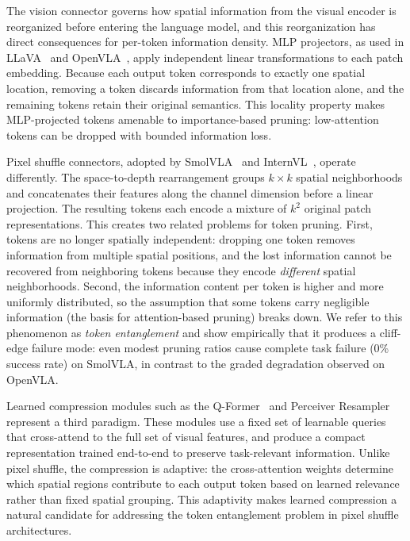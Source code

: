 The vision connector governs how spatial information from the visual encoder is reorganized before entering the language model, and this reorganization has direct consequences for per-token information density. MLP projectors, as used in LLaVA~\cite{liu2023llava} and OpenVLA~\cite{kim2024openvla}, apply independent linear transformations to each patch embedding. Because each output token corresponds to exactly one spatial location, removing a token discards information from that location alone, and the remaining tokens retain their original semantics. This locality property makes MLP-projected tokens amenable to importance-based pruning: low-attention tokens can be dropped with bounded information loss.

Pixel shuffle connectors, adopted by SmolVLA~\cite{shukor2025smolvla} and InternVL~\cite{chen2024internvl}, operate differently. The space-to-depth rearrangement groups $k \times k$ spatial neighborhoods and concatenates their features along the channel dimension before a linear projection. The resulting tokens each encode a mixture of $k^2$ original patch representations. This creates two related problems for token pruning. First, tokens are no longer spatially independent: dropping one token removes information from multiple spatial positions, and the lost information cannot be recovered from neighboring tokens because they encode \emph{different} spatial neighborhoods. Second, the information content per token is higher and more uniformly distributed, so the assumption that some tokens carry negligible information (the basis for attention-based pruning) breaks down. We refer to this phenomenon as \emph{token entanglement} and show empirically that it produces a cliff-edge failure mode: even modest pruning ratios cause complete task failure (0\% success rate) on SmolVLA, in contrast to the graded degradation observed on OpenVLA.

Learned compression modules such as the Q-Former~\cite{li2023blip2} and Perceiver Resampler~\cite{alayrac2022flamingo} represent a third paradigm. These modules use a fixed set of learnable queries that cross-attend to the full set of visual features, and produce a compact representation trained end-to-end to preserve task-relevant information. Unlike pixel shuffle, the compression is adaptive: the cross-attention weights determine which spatial regions contribute to each output token based on learned relevance rather than fixed spatial grouping. This adaptivity makes learned compression a natural candidate for addressing the token entanglement problem in pixel shuffle architectures.

